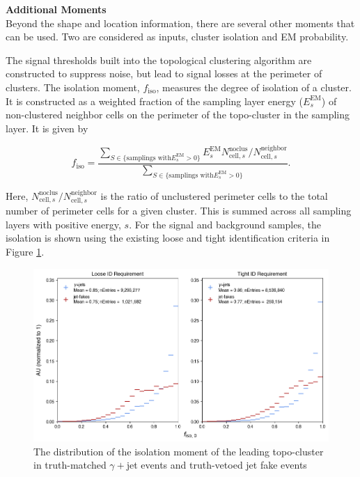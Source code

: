 \noindent\textbf{Additional Moments}\\
\indent Beyond the shape and location information, there are several other moments that can be used. Two are considered as inputs, cluster isolation and \gls{EM} probability.

The signal thresholds built into the topological clustering algorithm are constructed to suppress noise, but lead to signal losses at the perimeter of clusters. The isolation moment, $f_{\text{iso}}$, measures the degree of isolation of a cluster. It is constructed as a weighted fraction of the sampling layer energy ($E_{s}^{\text{EM}}$) of non-clustered neighbor cells on the perimeter of the topo-cluster in the sampling layer. It is given by

\begin{equation}
    f_{\text{iso}} = \frac
    {
    \sum_{S \in \{ \text{samplings with} E_{s}^{\text{EM}} > 0 \} }  
    E_{s}^{\text{EM}} N_{\text{cell},s}^{\text{noclus}} / N_{\text{cell},s}^{\text{neighbor}}
    } 
    {
        \sum_{S \in \{ \text{samplings with} E_{s}^{\text{EM}} > 0 \} }
    }.
\end{equation}

Here, $N_{\text{cell},s}^{\text{noclus}} / N_{\text{cell},s}^{\text{neighbor}}$ is the ratio of unclustered perimeter cells to the total number of perimeter cells for a given cluster. This is summed across all sampling layers with positive energy, $s$. For the signal and background samples, the isolation is shown using the existing loose and tight identification criteria in Figure \ref{fig:topo-isolation}.

\begin{figure}[htb]
    \centering 
    \includegraphics[width=\textwidth]{chapters/chapter4_photonID/images/hists/y_topoCluster0_isolation.png}
    \caption[The distribution of the isolation moment of the leading topo-cluster]{The distribution of the isolation moment of the leading topo-cluster in truth-matched $\gamma+$jet events and truth-vetoed jet fake events}
    \label{fig:topo-isolation}
\end{figure}

